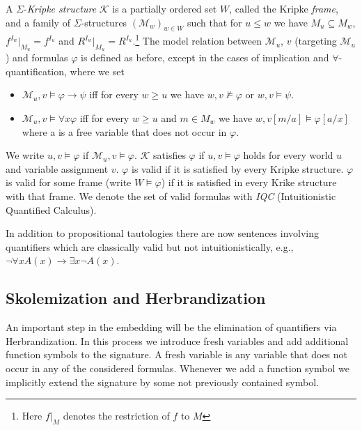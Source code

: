 \documentclass[runningheads]{llncs}
\begin{document}
\begin{definition}
	A $\Sigma$-\emph{Kripke structure} $\mathcal{K}$ is a partially ordered set $W$, called the Kripke \emph{frame}, and a family of $\Sigma$-structures $(\mathcal{M}_w)_{w\in W}$ such that for $u\leq w$ we have $M_u\subseteq M_w$, $f^{I_w}|_{M_u} = f^{I_u}$ and $R^{I_w}|_{M_u} = R^{I_u}$.\footnote{Here $f|_M$ denotes the restriction of $f$ to $M$}
	The model relation between $\mathcal M_u$, $v$ (targeting $\mathcal M_u$) and formulas $\varphi$ is defined as before, except in the cases of implication and $\forall$-quantification, where we set
	\begin{itemize}
		\item $\mathcal M_u, v\models \varphi\to\psi$ iff for every $w\geq u$ we have $w, v\not\models\varphi$ or $w, v\models\psi$.
		\item $\mathcal M_u, v\models\forall x\varphi$ iff for every $w\geq u$ and $m\in M_w$ we have $w, v[m/a]\models\varphi[a/x]$ where a is a free variable that does not occur in $\varphi$.
	\end{itemize}
	We write $u, v\models\varphi$ if $\mathcal M_u, v\models \varphi$. $\mathcal{K}$ satisfies $\varphi$ if $u, v\models\varphi$ holds for every world $u$ and variable assignment $v$. $\varphi$ is valid if it is satisfied by every Kripke structure.
	$\varphi$ is valid for some frame (write $W\models\varphi$) if it is satisfied in every Krike structure with that frame. We denote the set of valid formulas with \emph{IQC} (Intuitionistic Quantified Calculus).
\end{definition}
In addition to propositional tautologies there are now sentences involving quantifiers which are classically valid but not intuitionistically, e.g., $\neg\forall x A(x)\to \exists x \neg A(x)$.

\subsection{Skolemization and Herbrandization}\label{section:herbrandiaztion}

An important step in the embedding will be the elimination of quantifiers via Herbrandization.
In this process we introduce fresh variables and add additional function symbols to the signature.
A fresh variable is any variable that does not occur in any of the considered formulas.
Whenever we add a function symbol we implicitly extend the signature by some not previously contained symbol.
\end{document}
